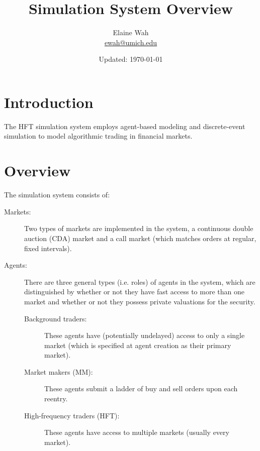 \documentclass[11pt]{article}
\title{Simulation System Overview}
\author{
  Elaine Wah \\
  \href{mailto:ewah@umich.edu}{ewah@umich.edu}
}
\date{Updated: \today}
\begin{document}
\maketitle

\section{Introduction}

The HFT simulation system employs agent-based modeling and discrete-event simulation to model algorithmic trading in financial markets.

\section{Overview}

The simulation system consists of:
\begin{description}
\item[Markets:] Two types of markets are implemented in the system, a
  continuous double auction (CDA) market and a call market (which matches orders at regular, fixed
  intervals).

\item[Agents:] There are three general types (i.e. roles) of agents in the system,
  which are distinguished by whether or not they have fast access to more than
  one market and whether or not they possess private valuations for the security.

\begin{description}
\item[Background traders:] These agents have (potentially
  undelayed) access to only a single market (which is specified at agent creation as their primary market). 

\item[Market makers (MM):] These agents submit a ladder of buy and sell orders upon each reentry. 

\item[High-frequency traders (HFT):] These agents have access to
  multiple markets (usually every market). 
\end{description}
\end{description}
\end{document}
